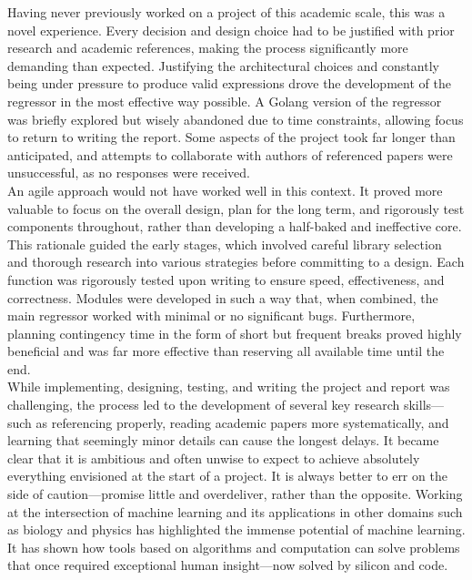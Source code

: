 \documentclass{article}
\begin{document}
Having never previously worked on a project of this academic scale, this was a novel experience. Every decision and design choice had to be justified with prior research and academic references, making the process significantly more demanding than expected. Justifying the architectural choices and constantly being under pressure to produce valid expressions drove the development of the regressor in the most effective way possible. A Golang version of the regressor was briefly explored but wisely abandoned due to time constraints, allowing focus to return to writing the report. Some aspects of the project took far longer than anticipated, and attempts to collaborate with authors of referenced papers were unsuccessful, as no responses were received.\\

An agile approach would not have worked well in this context. It proved more valuable to focus on the overall design, plan for the long term, and rigorously test components throughout, rather than developing a half-baked and ineffective core. This rationale guided the early stages, which involved careful library selection and thorough research into various strategies before committing to a design. Each function was rigorously tested upon writing to ensure speed, effectiveness, and correctness. Modules were developed in such a way that, when combined, the main regressor worked with minimal or no significant bugs. Furthermore, planning contingency time in the form of short but frequent breaks proved highly beneficial and was far more effective than reserving all available time until the end.\\

While implementing, designing, testing, and writing the project and report was challenging, the process led to the development of several key research skills—such as referencing properly, reading academic papers more systematically, and learning that seemingly minor details can cause the longest delays. It became clear that it is ambitious and often unwise to expect to achieve absolutely everything envisioned at the start of a project. It is always better to err on the side of caution—promise little and overdeliver, rather than the opposite. Working at the intersection of machine learning and its applications in other domains such as biology and physics has highlighted the immense potential of machine learning. It has shown how tools based on algorithms and computation can solve problems that once required exceptional human insight—now solved by silicon and code.\\
\end{document}
